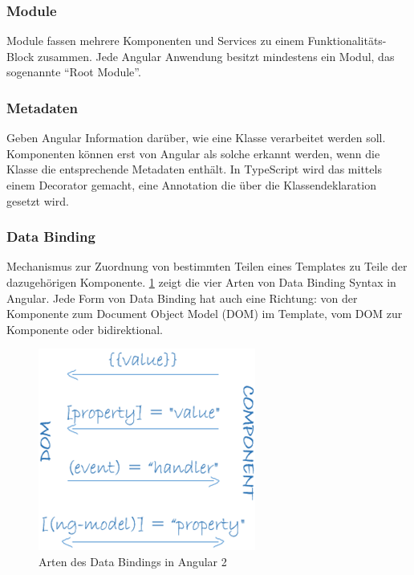 \subsubsection{Module}
Module fassen mehrere Komponenten und Services zu einem Funktionalitäts-Block zusammen. Jede Angular Anwendung besitzt mindestens ein Modul, das sogenannte \enquote{Root Module}.

\subsubsection{Metadaten}
Geben Angular Information darüber, wie eine Klasse verarbeitet werden soll. Komponenten können erst von Angular als solche erkannt werden, wenn die Klasse die entsprechende Metadaten enthält. In TypeScript wird das mittels einem Decorator gemacht, eine Annotation die über die Klassendeklaration gesetzt wird.

\subsubsection{Data Binding}
Mechanismus zur Zuordnung von bestimmten Teilen eines Templates zu Teile der dazugehörigen Komponente. \cref{fig:databinding} zeigt die vier Arten von Data Binding Syntax in Angular. Jede Form von Data Binding hat auch eine Richtung: von der Komponente zum Document Object Model (\acs{DOM}) im Template, vom DOM zur Komponente oder bidirektional.
\begin{figure}[ht!]
	\centering
	\includegraphics[width=0.4\linewidth]{bilder/kap5/databinding}
	\caption[Arten des Data Bindings in Angular 2]{Arten des Data Bindings in Angular 2\footnotemark}
	\label{fig:databinding}
\end{figure}



